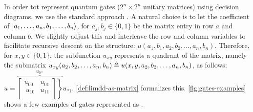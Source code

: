 In order tot represent quantum gates ($2^n\times 2^n$ unitary matrices) using decision diagrams, we use the standard approach \cite{fujita1997multi}.
A natural choice is to let the coefficient of $\ket{a_1, \dots, a_n, b_1, \dots, b_n}$, for $a_j, b_j \in \{0, 1\}$ be the matrix entry in row $a$ and column $b$.
We slightly adjust this and interleave the row and column variables to facilitate recursive descent on the structure:
 $u(a_1, b_1, a_2, b_2,  \dots, a_n, b_n)$. Therefore, for $x,y\in \{0, 1\}$, the subfunction $u_{xy}$ represents a quadrant of the matrix, namely the submatrix
$u_{xy}(a_2, b_2,  \dots, a_n, b_n) \triangleq u(x, y, a_2, b_2,  \dots, a_n, b_n) $, as follows:
$
u=\overbrace{
\left.
\begin{bmatrix}
u_{00} &  u_{01}   \\    %
~u_{10} & u_{11} \\
\end{bmatrix}
\right\rbrace
}^{u_{0*}}
u_{* 1}
$.
\autoref{def:limdd-as-matrix} formalizes this.
\autoref{fig:gates-examples} shows a few examples of gates represented as \limdds.

